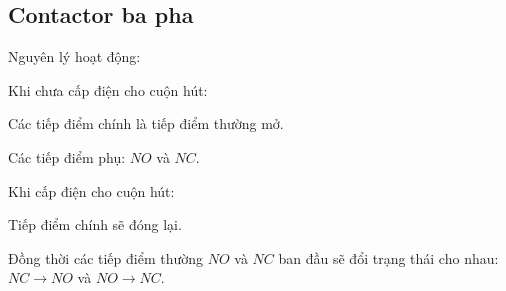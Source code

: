 \documentclass[13pt,a4paper]{extarticle}
\begin{document}
\subsection{Contactor ba pha}	
Nguyên lý hoạt động:
\begin{list}{--}{}
\item Khi chưa cấp điện cho cuộn hút:
\begin{list}{+}{}
\item Các tiếp điểm chính là tiếp điểm thường mở.
\item Các tiếp điểm phụ: $NO$ và $NC$.
\end{list}
\item Khi cấp điện cho cuộn hút:
\begin{list}{+}{}
\item Tiếp điểm chính sẽ đóng lại.
\item Đồng thời các tiếp điểm thường $NO$ và $NC$ ban đầu sẽ đổi trạng thái cho nhau: $NC \rightarrow NO$ và $NO \rightarrow NC$.
\end{list}
\end{list}
\end{document}
